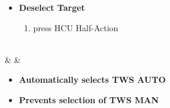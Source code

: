 \documentclass[fontInter]{TechCheck}
\begin{document}
\begin{listlongtable}
\begin{minipage}[t]{\linewidth}
\begin{itemize}
\begin{enumerate}[label=(\alph*), resume]
				\end{enumerate}
				\item \textbf{Deselect Target}
				\begin{enumerate}[label=(\alph*), resume]
					\item press HCU Half-Action
				\end{enumerate}
			\end{itemize}
		\end{minipage} \\
		\midrule
		\textbf{\textbullet} &  &
		\begin{minipage}[t]{\linewidth}
			\vspace{-7pt}
			\begin{itemize}
				\item \textbf{Automatically selects TWS AUTO}
				\item \textbf{Prevents selection of TWS MAN}
			\end{itemize}
		\end{minipage} \\
	\end{listlongtable}

	\clearpage
\end{document}
